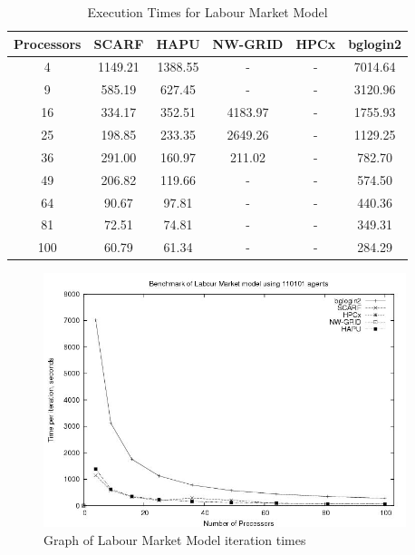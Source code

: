 {
\renewcommand{\arraystretch}{1.25}
\begin{table}[ht]
 \centering
  \begin{tabular}{c|ccccc}
 Processors &SCARF &HAPU  &NW-GRID &HPCx   &bglogin2 \\ \hline
4 &1149.21 &1388.55 &- &- &7014.64      \\
9 &585.19 &627.45 &- &- &3120.96        \\
16 &334.17 &352.51 &4183.97 &- &1755.93 \\
25 &198.85 &233.35 &2649.26 &- &1129.25 \\
36 &291.00 &160.97 &211.02 &- &782.70   \\
49 &206.82 &119.66 &- &- &574.50        \\
64 &90.67 &97.81 &- &- &440.36  \\
81 &72.51 &74.81 &- &- &349.31  \\
100 &60.79 &61.34 &- &- &284.29 \\

 \end{tabular}
 \caption{Execution Times for Labour Market Model}
 \label{tab:ExecutionTimesForLabour}
\end{table}
}
\bigskip
\begin{figure}[ht]
 \centering
  \includegraphics[width=300pt]{Labour2-graph.jpg}
 \caption{Graph of Labour Market Model iteration times}
 \label{fig:Labour-graph1}
\end{figure}

